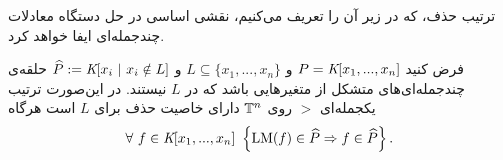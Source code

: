 ترتیب حذف، که در زیر آن را تعریف می‌کنیم، نقشی اساسی در حل دستگاه معادلات  چندجمله‌ای ایفا خواهد کرد.
\begin{definition}
فرض کنید 
$P = \textit{K}[x_{1},...,x_{n}]$
و
$L\subseteq \{x_{1},...,x_{n}\}$
و 
{\small $\widehat{P}:= \fld[x_{i} \ | \ x_{i}\notin L]$}
حلقه‌ی چندجمله‌ای‌های متشکل از متغیر‌هایی باشد که در 
$L$
نیستند. در این‌صورت ترتیب یکجمله‌ای 
$>$
روی
${\mathbb{T}}^{n}$
دارای خاصیت حذف برای 
$L$
است هر‌گاه
$$\fa \ f\in\polyring  \  \left\{\lm(f)\in\widehat{P}\Rightarrow f\in\widehat{P}\right\}.$$
\end{definition}


